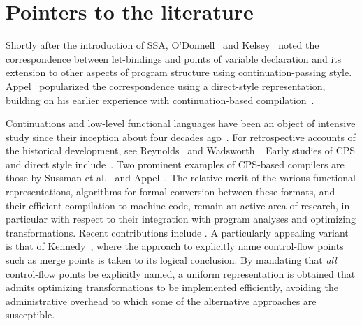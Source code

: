 {%



\section{Pointers to the literature}
\label{section:Part1:Semantics:Literature}



Shortly after the introduction of SSA, O'Donnell~\cite{ODonnellPhD}
and Kelsey~\cite{Kelsey95} noted the correspondence between
let-bindings and points of variable declaration and its extension to
other aspects of program structure using
continuation-passing style. Appel~\cite{Appel98:SSA,Appel:MCIML} popularized
the correspondence using a direct-style representation, building on
his earlier experience with continuation-based
compilation~\cite{Appel:CWC}. 

Continuations and low-level functional languages have been an object
of intensive study since their inception about four decades
ago~\cite{vanWijngaarden1966,Landin1965}.  For retrospective accounts
of the historical development, see Reynolds~\cite{Reynolds:LSC1993}
and Wadsworth~\cite{Wadsworth00}. Early studies of CPS and direct
style include~\cite{Reynolds:1972,Reynolds1974,Plotkin75}.  Two
prominent examples of CPS-based compilers are those by Sussman et
al.~\cite{DBLP:journals/lisp/SussmanS98a} and Appel~\cite{Appel:CWC}.
The relative merit of the various functional representations,
algorithms for formal conversion between these formats, and their
efficient compilation to machine code, remain an active area of
research, in particular with respect to their integration with program
analyses and optimizing transformations.  Recent contributions include
\cite{DBLP:journals/jfp/DanvyMN07,DBLP:journals/lisp/Reppy02,DBLP:conf/icfp/Kennedy07}. 
A particularly appealing variant is that of
Kennedy~\cite{DBLP:conf/icfp/Kennedy07}, where the approach to
explicitly name control-flow points such as merge points is taken to
its logical conclusion. By mandating that \emph{all} control-flow
points be explicitly named, a uniform representation is obtained that
admits optimizing transformations to be implemented efficiently,
avoiding the administrative overhead to which some of the alternative
approaches are susceptible.

}
